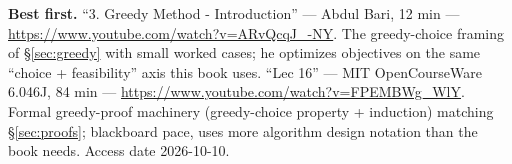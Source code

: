 \begin{rulebox}
\smallskip\noindent\textbf{Best first.}
``3. Greedy Method - Introduction'' --- Abdul Bari, 12 min ---
\url{https://www.youtube.com/watch?v=ARvQcqJ_-NY}. The greedy-choice
framing of \S\ref{sec:greedy} with small worked cases; he optimizes
objectives on the same ``choice + feasibility'' axis this book uses.
\smallskip\noindent
``Lec 16'' --- MIT OpenCourseWare 6.046J, 84 min ---
\url{https://www.youtube.com/watch?v=FPEMBWg_WlY}. Formal greedy-proof
machinery (greedy-choice property + induction) matching
\S\ref{sec:proofs}; blackboard pace, uses more algorithm design notation
than the book needs. Access date 2026-10-10.
\end{rulebox}
